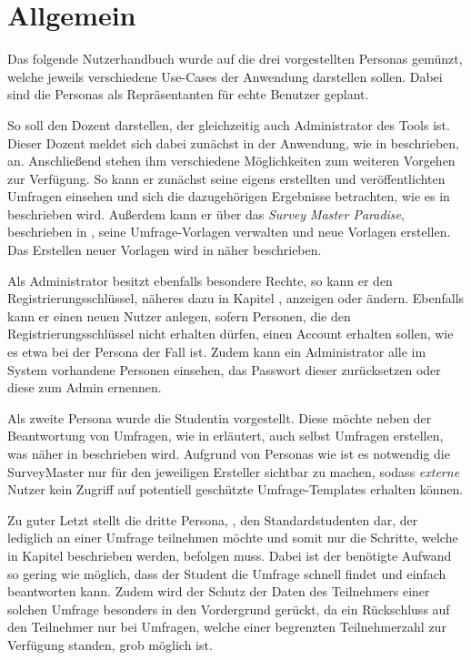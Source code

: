
\section{Allgemein}

Das folgende Nutzerhandbuch wurde auf die drei vorgestellten Personas gemünzt, welche jeweils verschiedene Use-Cases der Anwendung darstellen sollen.
Dabei sind die Personas als Repräsentanten für echte Benutzer geplant.

So soll \duzi den Dozent darstellen, der gleichzeitig auch Administrator des Tools ist.
Dieser Dozent meldet sich dabei zunächst in der Anwendung, wie in  beschrieben, an.
Anschließend stehen ihm verschiedene Möglichkeiten zum weiteren Vorgehen zur Verfügung.
So kann er zunächst seine eigens erstellten und veröffentlichten Umfragen einsehen und sich die dazugehörigen Ergebnisse betrachten, wie es in  beschrieben wird.
Außerdem kann er über das \emph{Survey Master Paradise}, beschrieben in , seine Umfrage-Vorlagen verwalten und neue Vorlagen erstellen.
Das Erstellen neuer Vorlagen wird in  näher beschrieben.

Als Administrator besitzt \duzi ebenfalls besondere Rechte, so kann er den Registrierungsschlüssel, näheres dazu in Kapitel , anzeigen oder ändern.
Ebenfalls kann er einen neuen Nutzer anlegen, sofern Personen, die den Registrierungsschlüssel nicht erhalten dürfen, einen Account erhalten sollen, wie es etwa bei der Persona \ariane der Fall ist. 
Zudem kann ein Administrator alle im System vorhandene Personen einsehen, das Passwort dieser zurücksetzen oder diese zum Admin ernennen.

Als zweite Persona wurde die Studentin \ariane vorgestellt.
Diese möchte neben der Beantwortung von Umfragen, wie in  erläutert, auch selbst Umfragen erstellen, was näher in  beschrieben wird.
Aufgrund von Personas wie \ariane ist es notwendig die SurveyMaster nur für den jeweiligen Ersteller sichtbar zu machen, sodass \textit{externe} Nutzer kein Zugriff auf potentiell geschützte Umfrage-Templates erhalten können.

Zu guter Letzt stellt die dritte Persona, \weigert, den Standardstudenten dar, der lediglich an einer Umfrage teilnehmen möchte und somit nur die Schritte, welche in Kapitel  beschrieben werden, befolgen muss.
Dabei ist der benötigte Aufwand so gering wie möglich, dass der Student die Umfrage schnell findet und einfach beantworten kann.
Zudem wird der Schutz der Daten des Teilnehmers einer solchen Umfrage besonders in den Vordergrund gerückt, da ein Rückschluss auf den Teilnehmer nur bei Umfragen, welche einer begrenzten Teilnehmerzahl zur Verfügung standen, grob möglich ist.

